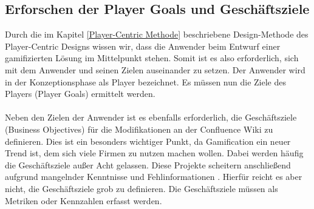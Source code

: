 \documentclass[a4paper,12pt,twoside]{scrartcl}
\begin{document}
\subsection{Erforschen der Player Goals und Geschäftsziele}
Durch die im Kapitel \ref{Player-Centric Methode} beschriebene Design-Methode des Player-Centric Designs wissen wir, dass die Anwender beim Entwurf einer gamifizierten Lösung im Mittelpunkt stehen. Somit ist es also erforderlich, sich mit dem Anwender und seinen Zielen auseinander zu setzen. Der Anwender wird in der  Konzeptionsphase als Player bezeichnet. Es müssen nun die Ziele des Players (Player Goals) ermittelt werden. 
\\\\
Neben den Zielen der Anwender ist es ebenfalls erforderlich, die Geschäftsziele (Business Objectives) für die Modifikationen an der Confluence Wiki zu definieren. Dies ist ein besonders wichtiger Punkt, da Gamification ein neuer Trend ist, dem sich viele Firmen zu nutzen machen wollen. Dabei werden häufig die Geschäftsziele außer Acht gelassen. Diese Projekte scheitern anschließend aufgrund mangelnder Kenntnisse und Fehlinformationen \cite{gamificationDefinition}. Hierfür reicht es aber nicht, die Geschäftsziele grob zu definieren. Die Geschäftsziele müssen als Metriken oder Kennzahlen erfasst werden.
\end{document}
